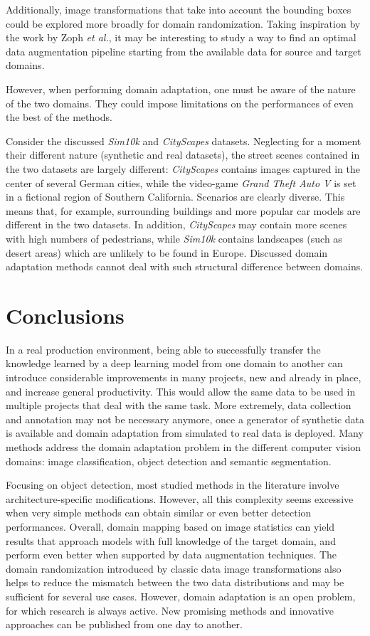 \documentclass[%
    corpo=12pt,
    twoside,
    stile=classica,   
    tipotesi=magistrale,
    evenboxes,
    english,
	numerazioneromana,
]{toptesi}
\begin{document}
\medskip
Additionally, image transformations that take into account the bounding boxes could be explored more broadly for domain randomization. Taking inspiration by the work by Zoph \textit{et al.}\cite{zoph2019learning}, it may be interesting to study a way to find an optimal data augmentation pipeline starting from the available data for source and target domains.

\bigskip
However, when performing domain adaptation, one must be aware of the nature of the two domains. They could impose limitations on the performances of even the best of the methods.

Consider the discussed \textit{Sim10k} and \textit{CityScapes} datasets. Neglecting for a moment their different nature (synthetic and real datasets), the street scenes contained in the two datasets are largely different: \textit{CityScapes} contains images captured in the center of several German cities, while the video-game \textit{Grand Theft Auto V} is set in a fictional region of Southern California. Scenarios are clearly diverse. This means that, for example, surrounding buildings and more popular car models are different in the two datasets. In addition, \textit{CityScapes} may contain more scenes with high numbers of pedestrians, while \textit{Sim10k} contains landscapes (such as desert areas) which are unlikely to be found in Europe. Discussed domain adaptation methods cannot deal with such structural difference between domains.


\chapter{Conclusions}
In a real production environment, being able to successfully transfer the knowledge learned by a deep learning model from one domain to another can introduce considerable improvements in many projects, new and already in place, and increase general productivity. This would allow the same data to be used in multiple projects that deal with the same task. More extremely, data collection and annotation may not be necessary anymore, once a generator of synthetic data is available and domain adaptation from simulated to real data is deployed. Many methods address the domain adaptation problem in the different computer vision domains: image classification, object detection and semantic segmentation.

\bigskip
Focusing on object detection, most studied methods in the literature involve architecture-specific modifications. However, all this complexity seems excessive when very simple methods can obtain similar or even better detection performances. Overall, domain mapping based on image statistics can yield results that approach models with full knowledge of the target domain, and perform even better when supported by data augmentation techniques. The domain randomization introduced by classic data image transformations also helps to reduce the mismatch between the two data distributions and may be sufficient for several use cases. However, domain adaptation is an open problem, for which research is always active. New promising methods and innovative approaches can be published from one day to another.


\backmatter
\english
\printbibliography[heading=bibintoc]
\end{document}
